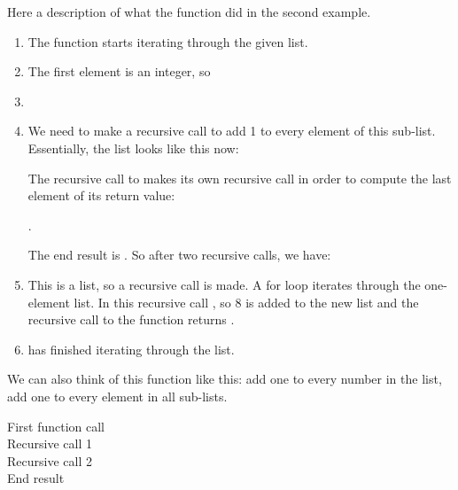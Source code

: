 \documentclass[11pt]{cselabheader}
\begin{document}
Here a description of what the function  did in the
second example.

\begin{enumerate}
\item The function starts iterating through the given list.
\item {}

The first element is an integer, so


\item {}


\item {}

We need to make a recursive call to add 1 to every element of this
sub-list. Essentially, the list looks like this now:


The recursive call to  makes its own recursive call
in order to compute the last element of its return value:

\pythoninline{[4, 5, add1([5])]}.

The end result is \pythoninline{[4, 5, [6]]}.
So after two recursive calls, we have:


\item {}

This is a list, so a recursive call is made. A for loop
iterates through the one-element list. In this recursive call
, so 8 is added to the new list and
the recursive call to the function returns \pythoninline{[8]}.


\item {} has finished iterating through the list.
\end{enumerate}

We can also think of this function like this: add one to every number
in the list, add one to every element in all sub-lists.

\begin{description}
\item[First function call] 
\item[Recursive call 1] 
\item[Recursive call 2] 
\item[End result] 
\end{description}
\end{document}
